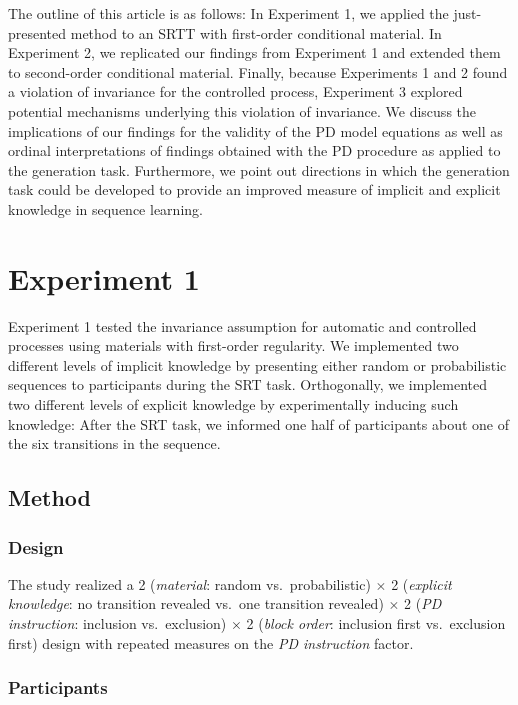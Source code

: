\documentclass[floatsintext,man]{apa6}
\begin{document}
The outline of this article is as follows: In Experiment 1, we applied
the just-presented method to an SRTT with first-order conditional
material. In Experiment 2, we replicated our findings from Experiment 1
and extended them to second-order conditional material. Finally, because
Experiments 1 and 2 found a violation of invariance for the controlled
process, Experiment 3 explored potential mechanisms underlying this
violation of invariance. We discuss the implications of our findings for
the validity of the PD model equations as well as ordinal
interpretations of findings obtained with the PD procedure as applied to
the generation task. Furthermore, we point out directions in which the
generation task could be developed to provide an improved measure of
implicit and explicit knowledge in sequence learning.

\section{Experiment 1}\label{experiment-1}

Experiment 1 tested the invariance assumption for automatic and
controlled processes using materials with first-order regularity. We
implemented two different levels of implicit knowledge by presenting
either random or probabilistic sequences to participants during the SRT
task. Orthogonally, we implemented two different levels of explicit
knowledge by experimentally inducing such knowledge: After the SRT task,
we informed one half of participants about one of the six transitions in
the sequence.

\subsection{Method}\label{method}

\subsubsection{Design}\label{design}

The study realized a 2 (\emph{material}: random vs.~probabilistic)
\(\times\) 2 (\emph{explicit knowledge}: no transition revealed vs.~one
transition revealed) \(\times\) 2 (\emph{PD instruction}: inclusion
vs.~exclusion) \(\times\) 2 (\emph{block order}: inclusion first
vs.~exclusion first) design with repeated measures on the \emph{PD
instruction} factor.

\subsubsection{Participants}\label{participants}
\end{document}
